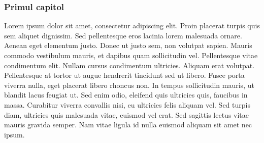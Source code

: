 \maketitle \begin{frame} 
\frametitle{Primul capitol} 
Lorem ipsum dolor sit amet, consectetur adipiscing elit. Proin placerat turpis quis sem aliquet dignissim. Sed pellentesque eros lacinia lorem malesuada ornare. Aenean eget elementum justo. Donec ut justo sem, non volutpat sapien. Mauris commodo vestibulum mauris, et dapibus quam sollicitudin vel. Pellentesque vitae condimentum elit. Nullam cursus condimentum ultricies. Aliquam erat volutpat. Pellentesque at tortor ut augue hendrerit tincidunt sed ut libero. Fusce porta viverra nulla, eget placerat libero rhoncus non. In tempus sollicitudin mauris, ut blandit lacus feugiat ut. Sed enim odio, eleifend quis ultricies quis, faucibus in massa. Curabitur viverra convallis nisi, eu ultricies felis aliquam vel. Sed turpis diam, ultricies quis malesuada vitae, euismod vel erat. Sed sagittis lectus vitae mauris gravida semper. Nam vitae ligula id nulla euismod aliquam sit amet nec ipsum.
\end{frame} 
